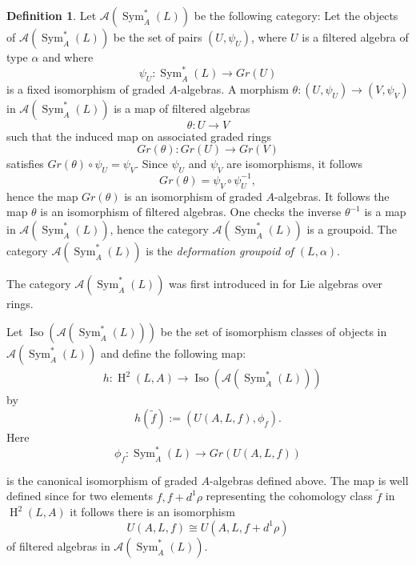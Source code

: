 \documentclass{amsart}
\theoremstyle{plain}
\theoremstyle{definition}
\newtheorem{definition}[theorem]{Definition}
\theoremstyle{remark}
\numberwithin{equation}{theorem}
\begin{document}
\begin{definition}\label{deformationgroupoid}
Let ${\mathcal{A}} ({\operatorname{Sym} }_{A}^*(L))$ be the following category: Let the objects of ${\mathcal{A}} ({\operatorname{Sym} }_{A}^*(L))$ be the set of pairs
$(U,\psi_U)$, where $U$ is a filtered algebra of type $\alpha$ and where
\[ \psi_U: {\operatorname{Sym} }_{A}^*(L)\rightarrow Gr(U) \]
is a fixed isomorphism of graded ${A}$-algebras.
A morphism $\theta: (U,\psi_U)\rightarrow (V,\psi_V)$ in ${\mathcal{A}} ({\operatorname{Sym} }_{A}^*(L))$ is a map
of filtered algebras
\[ \theta: U\rightarrow V\]
such that the induced map on associated graded rings
\[ Gr(\theta):Gr(U)\rightarrow Gr(V) \]
satisfies $Gr(\theta)\circ \psi_U=\psi_V$. Since $\psi_U$ and $\psi_V$ are isomorphisms, it follows 
\[ Gr(\theta)=\psi_V\circ \psi_U^{-1} ,\]
hence the map $Gr(\theta)$ is an isomorphism of graded ${A}$-algebras. It follows the map $\theta$
is an isomorphism of filtered algebras. One checks the inverse $\theta^{-1}$ is a map in ${\mathcal{A}} ({\operatorname{Sym} }_{A}^*(L))$, hence
the category ${\mathcal{A}} ({\operatorname{Sym} }_{A}^*(L))$ is a groupoid. 
The category ${\mathcal{A}} ({\operatorname{Sym} }_{A}^*(L))$ is the \emph{deformation groupoid of $(L,\alpha)$}.
\end{definition}

The category ${\mathcal{A}} ({\operatorname{Sym} }_{A}^*(L))$ was first introduced in \cite{sridharan} for Lie algebras
over rings.

Let ${\operatorname{Iso} } ({\mathcal{A}} ({\operatorname{Sym} }_{A}^*(L)))$ be the set of isomorphism classes of 
objects in ${\mathcal{A}} ({\operatorname{Sym} }_{A}^*(L))$ and define the following  map:
\begin{align}
&\label{groupoid_equivalence} h: {\operatorname{H} }^2(L,{A}) \rightarrow {\operatorname{Iso} } ({\mathcal{A}} ({\operatorname{Sym} }_{A}^*(L))) 
\end{align}
by
\[ h(\tilde{f}):=( U({A},L,f), \phi_f). \]
Here
\[ \phi_f:{\operatorname{Sym} }_{A}^*(L)\rightarrow Gr(U({A},L,f)) \]

is the canonical isomorphism of graded ${A}$-algebras defined above. 
The map is well defined since for two elements $f,f+d^1\rho$  representing
the cohomology class $\tilde{f}$ in ${\operatorname{H} }^2(L,{A})$ it follows there is an isomorphism
\[ U({A},L,f)\cong U({A},L,f+d^1\rho)\]
of filtered algebras in ${\mathcal{A}} ({\operatorname{Sym} }_{A}^*(L))$.
\end{document}
